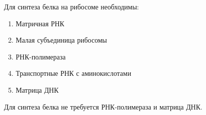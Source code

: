 
Для синтеза белка на рибосоме необходимы:

\begin{enumerate}
    \item Матричная РНК
    \item Малая субъединица рибосомы
    \item РНК-полимераза
    \item Транспортные РНК с аминокислотами
    \item Матрица ДНК
\end{enumerate}

\explanationSection

Для синтеза белка не требуется РНК-полимераза и матрица ДНК.

